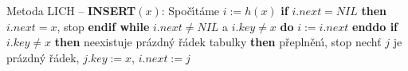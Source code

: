 \flushpar Metoda LICH -- {\bf INSERT$\left(x\right)$}:\newline 
Spo\v c\'\i t\'ame $i:=h\left(x\right)$\newline 
{\bf if} $i.next=NIL$ {\bf then} $i.next=x$, stop {\bf endif\newline 
while} $i.next\ne NIL$ a $i.key\ne x$ {\bf do} $i:=i.next$ {\bf enddo\newline 
if} $i.key\ne x$ {\bf then}\newline 
\phantom{---}{\bf if} neexistuje pr\'azdn\'y \v r\'adek tabulky {\bf then}\newline 
\phantom{------}p\v repln\v en\'\i, stop\newline 
\phantom{---}{\bf else}\newline 
\phantom{------}nech\v t $j$ je pr\'azdn\'y \v r\'adek, $j.key:=x$, $i.next:=j$\newline 
\phantom{---}{\bf endif\newline 
endif}
\medskip


